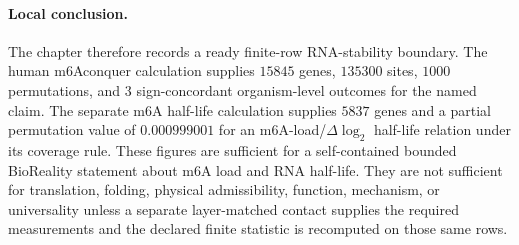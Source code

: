 \paragraph{Local conclusion.}
The chapter therefore records a ready finite-row RNA-stability boundary.  The human m6Aconquer calculation supplies $15845$ genes, $135300$ sites, $1000$ permutations, and $3$ sign-concordant organism-level outcomes for the named claim.  The separate m6A half-life calculation supplies $5837$ genes and a partial permutation value of $0.000999001$ for an m6A-load/$\Delta \log_2$ half-life relation under its coverage rule.  These figures are sufficient for a self-contained bounded BioReality statement about m6A load and RNA half-life.  They are not sufficient for translation, folding, physical admissibility, function, mechanism, or universality unless a separate layer-matched contact supplies the required measurements and the declared finite statistic is recomputed on those same rows.
